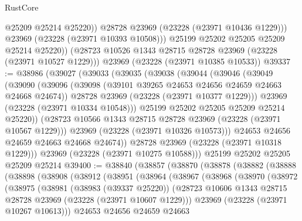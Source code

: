 \begin{lexlean}{RustCore}
\begin{coremodule}
                @25209
                @25214
                @25220))
            @28728
            @23969
            (@23228 (@23971 @10436 @1229)))
          @23969
          (@23228 (@23971 @10393 @10508)))
        @25199
        @25202
        @25205
        @25209
        @25214
        @25220))
    (@28723 @10526 @1343 @28715 @28728 @23969 (@23228 (@23971 @10527 @1229)))
    @23969
    (@23228 (@23971 @10385 @10533))
@39337 := @38986
    (@39027
      (@39033
        (@39035
          (@39038
            (@39044
              (@39046
                (@39049
                  (@39090
                    (@39096
                      (@39098 (@39101 @39265 @24653 @24656 @24659 @24663 @24668 @24674))
                      @28728
                      @23969
                      (@23228 (@23971 @10377 @1229)))
                    @23969
                    (@23228 (@23971 @10334 @10548)))
                  @25199
                  @25202
                  @25205
                  @25209
                  @25214
                  @25220))
              (@28723 @10566 @1343 @28715 @28728 @23969 (@23228 (@23971 @10567 @1229)))
              @23969
              (@23228 (@23971 @10326 @10573)))
            @24653
            @24656
            @24659
            @24663
            @24668
            @24674))
        @28728
        @23969
        (@23228 (@23971 @10318 @1229)))
      @23969
      (@23228 (@23971 @10275 @10588)))
    @25199
    @25202
    @25205
    @25209
    @25214
@39400 := @38840
    (@38857
      (@38870
        (@38878
          (@38882
            (@38888
              (@38898
                (@38908
                  (@38912
                    (@38951
                      (@38964
                        (@38967
                          (@38968
                            (@38970
                              (@38972
                                (@38975
                                  (@38981
                                    (@38983 (@39337 @25220))
                                    (@28723
                                      @10606
                                      @1343
                                      @28715
                                      @28728
                                      @23969
                                      (@23228 (@23971 @10607 @1229)))
                                    @23969
                                    (@23228 (@23971 @10267 @10613)))
                                  @24653
                                  @24656
                                  @24659
                                  @24663

\end{coremodule}
\end{lexlean}
